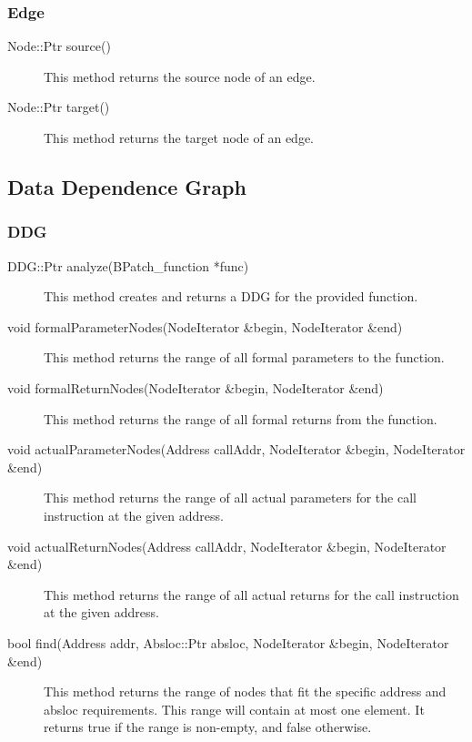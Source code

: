 \documentclass[12pt,titlepage]{article}
\begin{document}
\subsubsection{Edge}
\begin{description}
\item[Node::Ptr source()]
This method returns the source node of an edge.
\item[Node::Ptr target() ]
This method returns the target node of an edge.
\end{description}

\subsection{Data Dependence Graph}
\subsubsection{DDG}
\begin{description}
\item[DDG::Ptr analyze(BPatch\_function *func)]
This method creates and returns a DDG for the provided function.
\item[void formalParameterNodes(NodeIterator \&begin, NodeIterator \&end) ]
This method returns the range of all formal parameters to the function.
\item[void formalReturnNodes(NodeIterator \&begin, NodeIterator \&end)]
This method returns the range of all formal returns from the function.
\item[void actualParameterNodes(Address callAddr, NodeIterator \&begin, NodeIterator \&end) ]
This method returns the range of all actual parameters for the call instruction
at the given address.
\item[void actualReturnNodes(Address callAddr, NodeIterator \&begin, NodeIterator \&end)]
This method returns the range of all actual returns for the call instruction at
the given address.
\item[bool find(Address addr, Absloc::Ptr absloc, NodeIterator \&begin, NodeIterator \&end) ]
This method returns the range of nodes that fit the specific address
and absloc requirements. This range will contain at most one
element. It returns true if the range is non-empty, and false
otherwise. 
\end{description}
\end{document}
